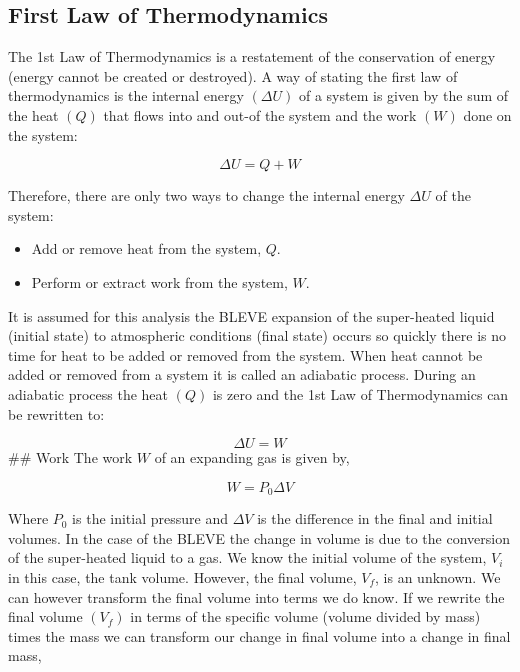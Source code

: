 \documentclass[10pt,parskip=half,
toc=sectionentrywithdots,
bibliography=totocnumbered,
captions=tableheading,numbers=noendperiod]{scrartcl}
\providecommand{\tightlist}{%
  \setlength{\itemsep}{0pt}\setlength{\parskip}{0pt}}
\begin{document}
\hypertarget{first-law-of-thermodynamics}{%
\subsection{First Law of
Thermodynamics}\label{first-law-of-thermodynamics}}

The 1st Law of Thermodynamics is a restatement of the conservation of
energy (energy cannot be created or destroyed). A way of stating the
first law of thermodynamics is the internal energy \((\Delta U)\) of a
system is given by the sum of the heat \((Q)\) that flows into and
out-of the system and the work \((W)\) done on the system:

\begin{equation}\Delta U = Q+W\end{equation}

Therefore, there are only two ways to change the internal energy
\(\Delta U\) of the system:

\begin{itemize}
\tightlist
\item
  Add or remove heat from the system, \(Q\).
\item
  Perform or extract work from the system, \(W\).
\end{itemize}

It is assumed for this analysis the BLEVE expansion of the super-heated
liquid (initial state) to atmospheric conditions (final state) occurs so
quickly there is no time for heat to be added or removed from the
system. When heat cannot be added or removed from a system it is called
an adiabatic process. During an adiabatic process the heat \((Q)\) is
zero and the 1st Law of Thermodynamics can be rewritten to:

\begin{equation}\Delta U = W\end{equation} \#\# Work The work \(W\) of
an expanding gas is given by,

\begin{equation}W = P_0\Delta V\end{equation}

Where \(P_0\) is the initial pressure and \(\Delta V\) is the difference
in the final and initial volumes. In the case of the BLEVE the change in
volume is due to the conversion of the super-heated liquid to a gas. We
know the initial volume of the system, \(V_i\) in this case, the tank
volume. However, the final volume, \(V_f\), is an unknown. We can
however transform the final volume into terms we do know. If we rewrite
the final volume \((V_f)\) in terms of the specific volume (volume
divided by mass) times the mass we can transform our change in final
volume into a change in final mass,
\end{document}
